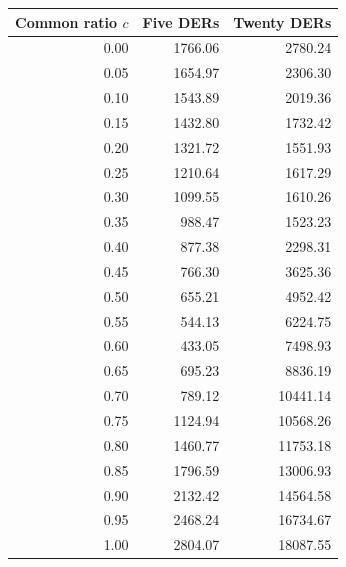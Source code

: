 \begin{tabular}{@{}rrr@{}}
\toprule
Common ratio $c$ & Five DERs & Twenty DERs\\
\midrule
0.00 & 1766.06 & 2780.24\\
0.05 & 1654.97 & 2306.30\\
0.10 & 1543.89 & 2019.36\\
0.15 & 1432.80 & 1732.42\\
0.20 & 1321.72 & 1551.93\\
0.25 & 1210.64 & 1617.29\\
0.30 & 1099.55 & 1610.26\\
0.35 & 988.47 & 1523.23\\
0.40 & 877.38 & 2298.31\\
0.45 & 766.30 & 3625.36\\
0.50 & 655.21 & 4952.42\\
0.55 & 544.13 & 6224.75\\
0.60 & 433.05 & 7498.93\\
0.65 & 695.23 & 8836.19\\
0.70 & 789.12 & 10441.14\\
0.75 & 1124.94 & 10568.26\\
0.80 & 1460.77 & 11753.18\\
0.85 & 1796.59 & 13006.93\\
0.90 & 2132.42 & 14564.58\\
0.95 & 2468.24 & 16734.67\\
1.00 & 2804.07 & 18087.55\\
\bottomrule
\end{tabular}
